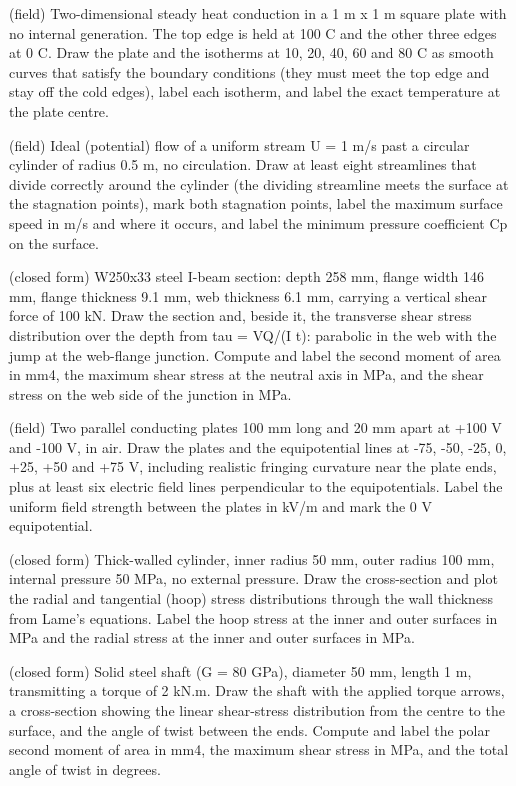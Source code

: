\documentclass[11pt,a4paper]{article}
\begin{document}
\begin{description}[style=nextline,leftmargin=1em]
\item[\texttt{laplace\_plate\_isotherms}] (field) Two-dimensional steady heat conduction in a 1 m x 1 m square plate with no internal generation. The top edge is held at 100 C and the other three edges at 0 C. Draw the plate and the isotherms at 10, 20, 40, 60 and 80 C as smooth curves that satisfy the boundary conditions (they must meet the top edge and stay off the cold edges), label each isotherm, and label the exact temperature at the plate centre.
\item[\texttt{potential\_flow\_cylinder}] (field) Ideal (potential) flow of a uniform stream U = 1 m/s past a circular cylinder of radius 0.5 m, no circulation. Draw at least eight streamlines that divide correctly around the cylinder (the dividing streamline meets the surface at the stagnation points), mark both stagnation points, label the maximum surface speed in m/s and where it occurs, and label the minimum pressure coefficient Cp on the surface.
\item[\texttt{ibeam\_shear\_stress}] (closed form) W250x33 steel I-beam section: depth 258 mm, flange width 146 mm, flange thickness 9.1 mm, web thickness 6.1 mm, carrying a vertical shear force of 100 kN. Draw the section and, beside it, the transverse shear stress distribution over the depth from tau = VQ/(I t): parabolic in the web with the jump at the web-flange junction. Compute and label the second moment of area in mm4, the maximum shear stress at the neutral axis in MPa, and the shear stress on the web side of the junction in MPa.
\item[\texttt{capacitor\_fringe\_field}] (field) Two parallel conducting plates 100 mm long and 20 mm apart at +100 V and -100 V, in air. Draw the plates and the equipotential lines at -75, -50, -25, 0, +25, +50 and +75 V, including realistic fringing curvature near the plate ends, plus at least six electric field lines perpendicular to the equipotentials. Label the uniform field strength between the plates in kV/m and mark the 0 V equipotential.
\item[\texttt{thick\_cylinder\_lame}] (closed form) Thick-walled cylinder, inner radius 50 mm, outer radius 100 mm, internal pressure 50 MPa, no external pressure. Draw the cross-section and plot the radial and tangential (hoop) stress distributions through the wall thickness from Lame's equations. Label the hoop stress at the inner and outer surfaces in MPa and the radial stress at the inner and outer surfaces in MPa.
\item[\texttt{shaft\_torsion}] (closed form) Solid steel shaft (G = 80 GPa), diameter 50 mm, length 1 m, transmitting a torque of 2 kN.m. Draw the shaft with the applied torque arrows, a cross-section showing the linear shear-stress distribution from the centre to the surface, and the angle of twist between the ends. Compute and label the polar second moment of area in mm4, the maximum shear stress in MPa, and the total angle of twist in degrees.

\end{description}
\end{document}
